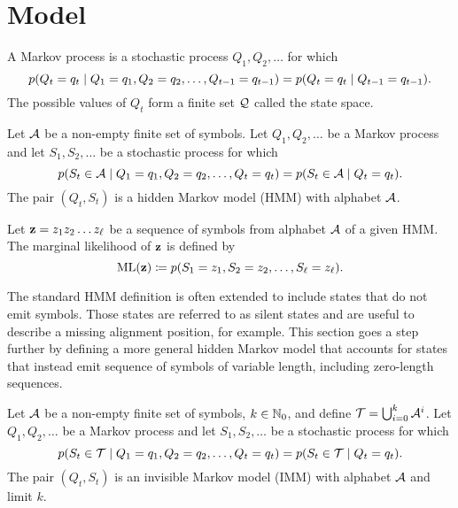 \section{Model}

\begin{definition}\label{def:mp}
  A Markov process is a stochastic process $Q_1, Q_2, \dots$ for which
  \begin{equation*}
    p(Q_t=q_t \;|\; Q_1=q_1, Q_2=q_2, \dots, Q_{t-1}=q_{t-1}) = p(Q_t=q_t \;|\; Q_{t-1}=q_{t-1}).
  \end{equation*}
  The possible values of $Q_t$ form a finite set $\mathcal{Q}$ called the state space.
\end{definition}

\begin{definition}\label{def:hmm}
  Let $\mathcal{A}$ be a non-empty finite set of symbols. Let $Q_1, Q_2, \dots$ be a Markov process and
  let $S_1, S_2, \dots$ be a stochastic process for which
  \begin{equation*}
    p(S_t\in\mathcal{A} \;|\; Q_1=q_1, Q_2=q_2, \dots, Q_t=q_t) = p(S_t\in\mathcal{A} \;|\; Q_t=q_t).
  \end{equation*}
  The pair $(Q_t, S_t)$ is a hidden Markov model (HMM) with alphabet $\mathcal{A}$.
\end{definition}

Let $\mathbf{z}=z_1z_2 \dots z_\ell$ be a sequence of symbols from alphabet $\mathcal{A}$ of a given HMM.\@
The marginal likelihood of $\mathbf{z}$ is defined by
\begin{equation}\label{eq:hml}
  \mathrm{ML}(\mathbf{z}) \coloneqq p(S_1=z_1, S_2=z_2, \dots, S_\ell=z_\ell).
\end{equation}

The standard HMM definition is often extended to include states that do not emit symbols. Those
states are referred to as silent states and are useful to describe a missing alignment position, for
example. This section goes a step further by defining a more general hidden Markov model that
accounts for states that instead emit sequence of symbols of variable length, including zero-length
sequences.

\begin{definition}
  Let $\mathcal{A}$ be a non-empty finite set of symbols, $k\in\mathbb{N}_0$, and define
  $\mathcal{T}=\bigcup_{i=0}^k\mathcal{A}^i$.
  Let $Q_1, Q_2, \dots$ be a Markov process and let $S_1, S_2, \dots$ be a stochastic process for
  which
  \begin{equation*}
    p(S_t\in\mathcal{T} \;|\; Q_1=q_1, Q_2=q_2, \dots, Q_t=q_t)
    = p(S_t\in\mathcal{T} \;|\; Q_t=q_t).
  \end{equation*}
  The pair $(Q_t, S_t)$ is an invisible Markov model (IMM) with alphabet $\mathcal{A}$ and
  limit $k$.
\end{definition}

